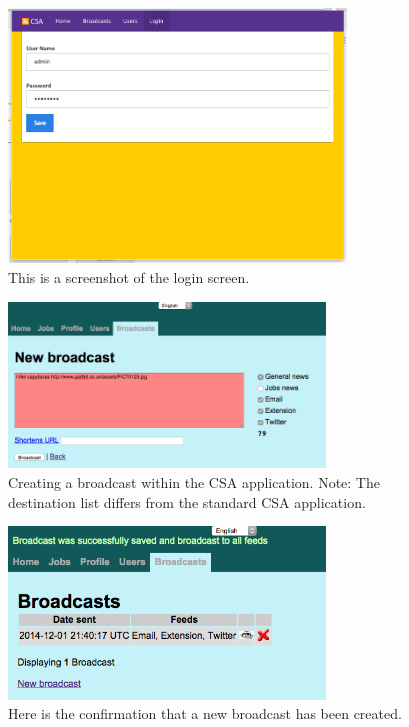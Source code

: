 \documentclass{article}
\begin{document}
\begin{figure}[H]
\centering
\includegraphics[width=0.8\textwidth]{loginpage}
\caption{This is a screenshot of the login screen.}
\end{figure}

\begin{figure}[H]
\centering
\includegraphics[width=0.75\textwidth]{createbc}
\caption{Creating a broadcast within the CSA application. Note: The destination list differs from the standard CSA application.}
\end{figure}

\begin{figure}[H]
\centering
\includegraphics[width=0.75\textwidth]{confbc}
\caption{Here is the confirmation that a new broadcast has been created.}
\end{figure}
\end{document}
